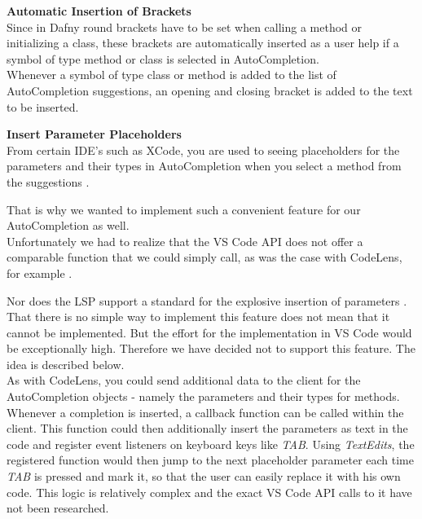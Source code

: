 
\textbf{Automatic Insertion of Brackets}\\
Since in Dafny round brackets have to be set when calling a method or initializing a class,
these brackets are automatically inserted as a user help
if a symbol of type method or class is selected in AutoCompletion. \\

Whenever a symbol of type class or method is added to the list of AutoCompletion suggestions,
an opening and closing bracket is added to the text to be inserted.


\textbf{Insert Parameter Placeholders}\\
From certain IDE's such as XCode,
you are used to seeing placeholders for the parameters and their types in AutoCompletion
when you select a method from the suggestions \cite{sa}.

That is why we wanted to implement such a convenient feature for our AutoCompletion as well. \\

Unfortunately we had to realize that the VS Code API
does not offer a comparable function that we could simply call,
as was the case with CodeLens, for example \cite{vscodeAPI}.

Nor does the LSP support a standard for the explosive insertion of parameters \cite{lspspec}. \\

That there is no simple way to implement this feature does not mean that it cannot be implemented.
But the effort for the implementation in VS Code would be exceptionally high.
Therefore we have decided not to support this feature.
The idea is described below. \\

As with CodeLens, you could send additional data to the client
for the AutoCompletion objects - namely the parameters and their types for methods.
Whenever a completion is inserted, a callback function can be called within the client.
This function could then additionally insert the parameters as text in the code and register
event listeners on keyboard keys like \textit{TAB}.
Using \textit{TextEdits}, the registered function would then jump to the next placeholder parameter
each time \textit{TAB} is pressed and mark it, so that the user can easily replace it with his own code.
This logic is relatively complex and the exact VS Code API calls to it have not been researched. \\

